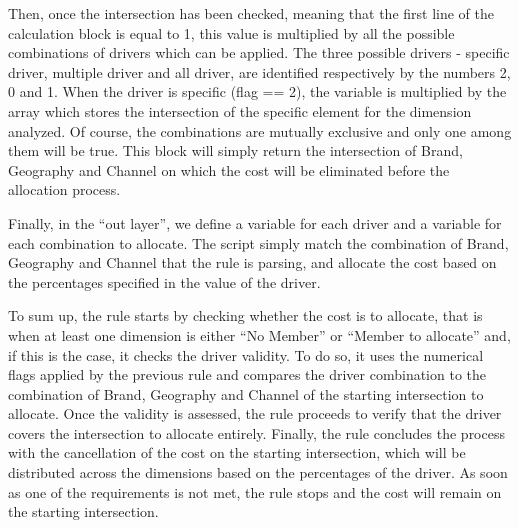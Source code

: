 \documentclass[12pt,a4paper,openright,twoside]{book}
\begin{document}
Then, once the intersection has been checked, meaning that the first line of the calculation block is equal to 1, this value is multiplied by all the possible combinations of drivers which can be applied.
%
The three possible drivers - specific driver, multiple driver and all driver, are identified respectively by the numbers 2, 0 and 1.
%
When the driver is specific (flag == 2), the variable is multiplied by the array which stores the intersection of the specific element for the dimension analyzed.
%
Of course, the combinations are mutually exclusive and only one among them will be true.
%
This block will simply return the intersection of Brand, Geography and Channel on which the cost will be eliminated before the allocation process.

Finally, in the ``out layer'', we define a variable for each driver and a variable for each combination to allocate.
%
The script simply match the combination of Brand, Geography and Channel that the rule is parsing, and allocate the cost based on the percentages specified in the value of the driver.

To sum up, the rule starts by checking whether the cost is to allocate, that is when at least one dimension is either ``No Member'' or ``Member to allocate'' and, if this is the case, it checks the driver validity.
%
To do so, it uses the numerical flags applied by the previous rule and compares the driver combination to the combination of Brand, Geography and Channel of the starting intersection to allocate.
%
Once the validity is assessed, the rule proceeds to verify that the driver covers the intersection to allocate entirely.
%
Finally, the rule concludes the process with the cancellation of the cost on the starting intersection, which will be distributed across the dimensions based on the percentages of the driver.
%
As soon as one of the requirements is not met, the rule stops and the cost will remain on the starting intersection.
\end{document}
